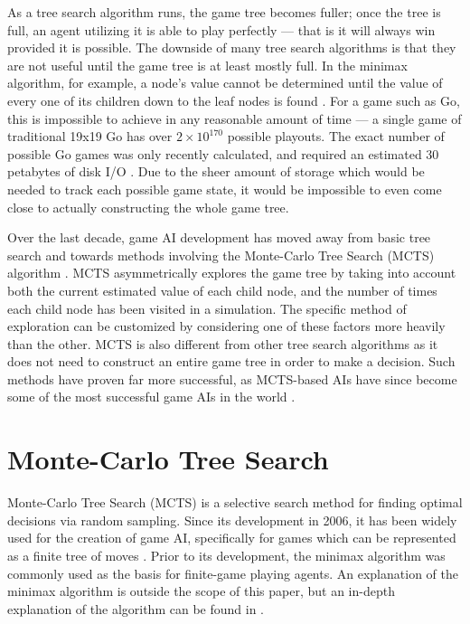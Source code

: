 As a tree search algorithm runs, the game tree becomes fuller; once the tree is full, an agent utilizing it is able to play perfectly --- that is it will always win provided it is possible.  The downside of many tree search algorithms is that they are not useful until the game tree is at least mostly full.  In the minimax algorithm, for example, a node's value cannot be determined until the value of every one of its children down to the leaf nodes is found \cite{minimax}.  For a game such as Go, this is impossible to achieve in any reasonable amount of time --- a single game of traditional 19x19 Go has over $2 \times 10^{170}$ possible playouts.  The exact number of possible Go games was only recently calculated, and required an estimated 30 petabytes of disk I/O \cite{Trompfinal}.  Due to the sheer amount of storage which would be needed to track each possible game state, it would be impossible to even come close to actually constructing the whole game tree.

Over the last decade, game AI development has moved away from basic tree search and towards methods involving the Monte-Carlo Tree Search (MCTS) algorithm \cite{browne2012survey}.  MCTS asymmetrically explores the game tree by taking into account both the current estimated value of each child node, and the number of times each child node has been visited in a simulation.  The specific method of exploration can be customized by considering one of these factors more heavily than the other.  MCTS is also different from other tree search algorithms as it does not need to construct an entire game tree in order to make a decision.  Such methods have proven far more successful, as MCTS-based AIs have since become some of the most successful game AIs in the world \cite{alphago, benzene}.

\section{Monte-Carlo Tree Search}\label{sec:mcts}
Monte-Carlo Tree Search (MCTS) is a selective search method for finding optimal decisions via random sampling. Since its development in 2006, it has been widely used for the creation of game AI, specifically for games which can be represented as a finite tree of moves \cite{chaslot2008monte, browne2012survey}.  Prior to its development, the minimax algorithm was commonly used as the basis for finite-game playing agents.  An explanation of the minimax algorithm is outside the scope of this paper, but an in-depth explanation of the algorithm can be found in \cite{minimax}.


